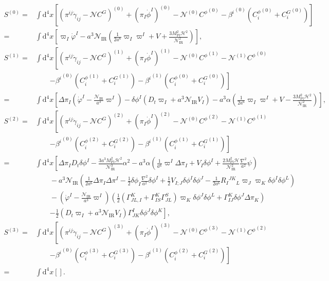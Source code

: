 \documentclass[aps, prd
, preprint
, nofootinbib 
, notitlepage
, longbibliography
]{revtex4-1}
\newcommand{\dd}{\mathrm{d}}
\newcommand{\Mpl}{M_\text{Pl}}
\newcommand{\IR}{\text{IR}}
\newcommand{\calH}{\mathcal{H}}
\newcommand{\calN}{\mathcal{N}}
\newcommand{\dphi}{\delta\phi}
\newcommand{\Dpi}{\Delta\pi}
\newcommand{\bae}[1]{\begin{align} #1 \end{align}}
\begin{document}
\bae{
	S^{(0)} =& \int\dd^4x\left[(\pi^{ij}\dot{\gamma}_{ij}-\calN C^G)^{(0)}+(\pi_I\dot{\phi}^I)^{(0)}-\calN^{(0)}{C^\phi}^{(0)}
	-{\beta^i}^{(0)}({C_i^\phi}^{(0)}+{C_i^G}^{(0)})\right]
	\nonumber \\
	=&\int\dd^4x\left[\varpi_I\dot{\varphi}^I-a^3\calN_\IR\left(\frac{1}{2a^6}\varpi_I\varpi^I+V+\frac{3\Mpl^2\calH^2}{\calN_\IR^2}\right)\right], \\
	S^{(1)} =& \int\dd^4x\left[(\pi^{ij}\dot{\gamma}_{ij}-\calN C^G)^{(1)}+(\pi_I\dot{\phi}^I)^{(1)}-\calN^{(0)}{C^\phi}^{(1)}-\calN^{(1)}{C^\phi}^{(0)} \right. \nonumber \\
	&\qquad \left.-{\beta^i}^{(0)}({C_i^\phi}^{(1)}+{C_i^G}^{(1)})-{\beta^i}^{(1)}({C_i^\phi}^{(0)}+{C_i^G}^{(0)})\right] \nonumber \\
	=&\int\dd^4x\left[\Dpi_I\left(\dot{\varphi}^I-\frac{\calN_\IR}{a^3}\varpi^I\right)-\dphi^I\left(D_t\varpi_I+a^3\calN_\IR V_I\right)
	-a^3\alpha\left(\frac{1}{2a^6}\varpi_I\varpi^I+V-\frac{3\Mpl^2\calH^2}{\calN_\IR^2}\right)\right], \\
	S^{(2)}=&\int\dd^4x\left[(\pi^{ij}\dot{\gamma}_{ij}-\calN C^G)^{(2)}+(\pi_I\dot{\phi}^I)^{(2)}-\calN^{(0)}{C^\phi}^{(2)}-\calN^{(1)}{C^\phi}^{(1)} \right. \nonumber \\
	&\qquad \left. -{\beta^i}^{(0)}({C_i^\phi}^{(2)}+{C_i^G}^{(2)})-{\beta^i}^{(1)}({C_i^\phi}^{(1)}+{C_i^G}^{(1)})\right] \nonumber \\
	=&\int\dd^4x\left[\Dpi_ID_t\dphi^I-\frac{3a^3\Mpl^2\calH^2}{\calN_\IR^3}\alpha^2-a^3\alpha\left(\frac{1}{a^6}\varpi^I\Dpi_I+V_I\dphi^I
	+\frac{2\Mpl^2\calH}{\calN_\IR^2}\frac{\nabla^2}{a^2}\psi\right) \right. \nonumber \\
	&\qquad -a^3\calN_\IR\left(\frac{1}{2a^6}\Dpi_I\Dpi^I-\frac{1}{2}\dphi_I\frac{\nabla^2}{a^2}\dphi^I+\frac{1}{2}V_{I;J}\dphi^I\dphi^J
	-\frac{1}{2a^6}R_I{}^{JK}{}_L\varpi_J\varpi_K\dphi^I\dphi^L\right) \nonumber \\
	&\qquad -\left(\dot{\varphi}^I-\frac{\calN_\IR}{a^3}\varpi^I\right)\left(\frac{1}{2}(\Gamma^K_{JL,I}+\Gamma^K_{IS}\Gamma^S_{JL})\varpi_K\dphi^J\dphi^L
	+\Gamma_{IJ}^K\dphi^J\Dpi_K\right) \nonumber \\
	&\qquad \left.-\frac{1}{2}\left(D_t\varpi_I+a^3\calN_\IR V_I\right)\Gamma^I_{JK}\dphi^J\dphi^K\right], \\
	S^{(3)}=&\int\dd^4x\left[(\pi^{ij}\dot{\gamma}_{ij}-\calN C^G)^{(3)}+(\pi_I\dot{\phi}^I)^{(3)}-\calN^{(0)}{C^\phi}^{(3)}-\calN^{(1)}{C^\phi}^{(2)} \right. \nonumber \\
	&\qquad \left. -{\beta^i}^{(0)}({C_i^\phi}^{(3)}+{C_i^G}^{(3)})-{\beta^i}^{(1)}({C_i^\phi}^{(2)}+{C_i^G}^{(2)})\right] \nonumber \\
	=&\int\dd^4x\left[\right].
}
















\end{document}

